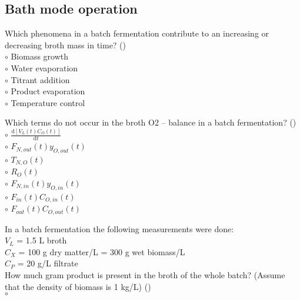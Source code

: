 \documentclass[]{beamer}
\begin{document}
\subsection{Bath mode operation}
\setcounter{questions}{0}
\begin{frame}[shrink] {}
\addtocounter{questions}{1}
\color{blue}
Which phenomena in a batch fermentation contribute to an increasing or decreasing broth mass in time? ()\\
\color{black}
\setlength{\parindent}{-0.4cm}
{\color{red}$\circ$}  Biomass growth \\
{\color{red}$\circ$} Water evaporation \\
{\color{red}$\circ$} Titrant addition \\
{\color{red}$\circ$} Product evaporation \\
{\color{red}$\circ$} Temperature control  \\
\end{frame}

\begin{frame}[shrink] {}
\addtocounter{questions}{1}
\color{blue}
Which terms do not occur in the broth O2 – balance in a batch fermentation? ()\\
\color{black}
\setlength{\parindent}{-0.4cm}
{\color{red}$\circ$} $\frac{\mathrm d [V_{L}(t)C_O(t)]}{\mathrm dt}$ \\[0.3em]
{\color{red}$\circ$} $F_{N,out}(t) y_{O,out}(t)$ \\
{\color{red}$\circ$} $T_{N,O} (t)$ \\
{\color{red}$\circ$} $R_O (t)$ \\
{\color{red}$\circ$} $F_{N,in}(t) y_{O,in}(t)$ \\
{\color{red}$\circ$} $F_{in}(t) C_{O,in}(t)$ \\
{\color{red}$\circ$} $F_{out}(t) C_{O,out}(t)$ \\
\end{frame}

\begin{frame}[shrink] {}
\addtocounter{questions}{1}
\color{blue}
In a batch fermentation the following measurements were done: \\
\color{gray}
$V_L$ = 1.5 L broth  \\
$C_X$ = 100 g dry matter/L = 300 g wet biomass/L \\
$C_P$ = 20 g/L filtrate \\
\color{blue}
How much gram product is present in the broth of the whole batch? 
(Assume that the density of biomass is 1 kg/L) ()\\
\color{black}
{\color{red}$\circ$}  \\
\end{frame}
\end{document}
